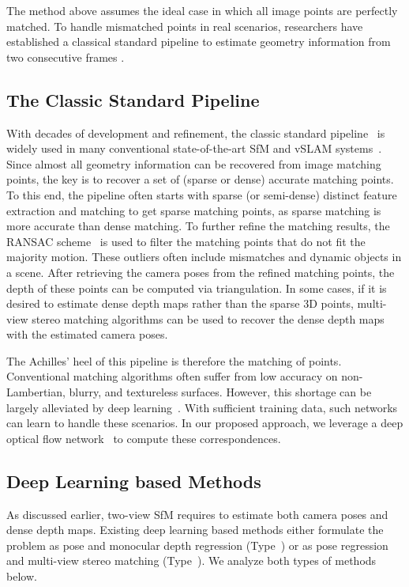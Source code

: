 \documentclass[final]{cvpr}
\begin{document}
The method above assumes the ideal case in which all image points are perfectly matched. To handle mismatched points in real scenarios, researchers have established a classical standard pipeline to estimate geometry information from two consecutive frames \cite{hartley2003multiple}.

\subsection{The Classic Standard Pipeline}
With decades of development and refinement, the classic standard pipeline~\cite{hartley2003multiple} is widely used in many conventional state-of-the-art SfM and vSLAM systems~\cite{mur2015orbslam,colmap,agarwal2011building}. Since almost all geometry information can be recovered from image matching points, the key is to recover a set of (sparse or dense) accurate matching points. To this end, the pipeline often starts with sparse (or semi-dense) distinct feature extraction and matching to get sparse matching points, as sparse matching is more accurate than dense matching. To further refine the matching results, the RANSAC scheme~\cite{fischler1981random} is used to filter the matching points that do not fit the majority motion. These outliers often include mismatches and dynamic objects in a scene. After retrieving the camera poses from the refined matching points, the depth of these points can be computed via triangulation. In some cases, if it is desired to estimate dense depth maps rather than the sparse 3D points, multi-view stereo matching algorithms can be used to recover the dense depth maps with the estimated camera poses.

The Achilles' heel of this pipeline is therefore the matching of points. Conventional matching algorithms often suffer from low accuracy on non-Lambertian, blurry, and textureless surfaces. However, this shortage can be largely alleviated by deep learning~\cite{sun2018pwc,teed2020raft,zhong2020nipsflow, Zhong_2018_ECCV,cheng2020hierarchical,li2021arvo}. With sufficient training data, such networks can learn to handle these scenarios. 
In our proposed approach, we leverage a deep optical flow network~\cite{zhong2020nipsflow} to compute these correspondences.


\subsection{Deep Learning based Methods}

As discussed earlier, two-view SfM requires to estimate both camera poses and dense depth maps.  Existing deep learning based methods either formulate the problem as pose and monocular depth regression (Type~) or as pose regression and multi-view stereo matching (Type~). We analyze both types of methods below.
\end{document}
